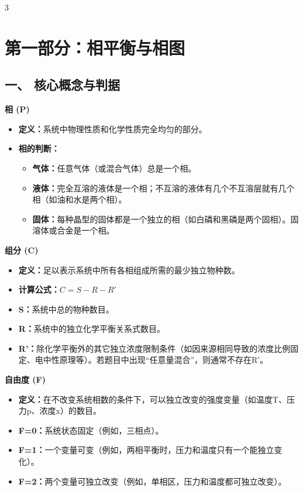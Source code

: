 \documentclass[a4paper,6pt]{article} %
\begin{document}
\pagestyle{empty} %

\begin{multicols}{3}

\section*{第一部分：相平衡与相图}
\subsection*{一、 核心概念与判据}
\textbf{相 (P)}
\begin{itemize}
    \item \textbf{定义：}系统中物理性质和化学性质完全均匀的部分。
    \item \textbf{相的判断：}
    \begin{itemize}
        \item \textbf{气体：}任意气体（或混合气体）总是一个相。
        \item \textbf{液体：}完全互溶的液体是一个相；不互溶的液体有几个不互溶层就有几个相（如油和水是两个相）。
        \item \textbf{固体：}每种晶型的固体都是一个独立的相（如白磷和黑磷是两个固相）。固溶体或合金是一个相。
    \end{itemize}
\end{itemize}

\textbf{组分 (C)}
\begin{itemize}
    \item \textbf{定义：}足以表示系统中所有各相组成所需的最少独立物种数。
    \item \textbf{计算公式：}$C = S - R - R'$
    \item \textbf{S：}系统中总的物种数目。
    \item \textbf{R：}系统中的独立化学平衡关系式数目。
    \item \textbf{R'：}除化学平衡外的其它独立浓度限制条件（如因来源相同导致的浓度比例固定、电中性原理等）。若题目中出现“任意量混合”，则通常不存在R'。
\end{itemize}

\textbf{自由度 (F)}
\begin{itemize}
    \item \textbf{定义：}在不改变系统相数的条件下，可以独立改变的强度变量（如温度T、压力p、浓度x）的数目。
    \item \textbf{F=0：}系统状态固定（例如，三相点）。
    \item \textbf{F=1：}一个变量可变（例如，两相平衡时，压力和温度只有一个能独立变化）。
    \item \textbf{F=2：}两个变量可独立改变（例如，单相区，压力和温度都可独立改变）。
\end{itemize}


\end{multicols}
\end{document}
